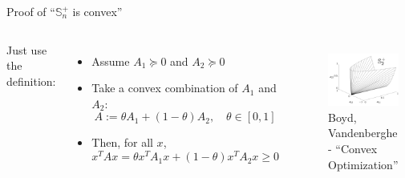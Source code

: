 \documentclass[aspectratio=169]{beamer}
\begin{document}
\begin{frame}{Proof of ``$\mathbb S_n^+$ is convex''}
\begin{columns}
Just use the definition:
\begin{itemize}
\item
Assume $A_1 \succeq 0$ and $A_2 \succeq 0$
\item
Take a convex combination of  $A_1$ and $A_2$:
$$
A := \theta A_1 + (1- \theta) A_2, \quad \theta \in [0, 1]
$$
\item
Then, for all $x$,
$$x^T A x = \theta x^T A_1 x + (1- \theta) x^T A_2 x \geq 0$$
\end{itemize}
\begin{figure}
\includegraphics[width=\columnwidth]{figures/psdcone.jpeg}
\footnotesize Boyd, Vandenberghe - ``Convex Optimization''
\end{figure}
\end{columns}
\end{frame}
\end{document}
